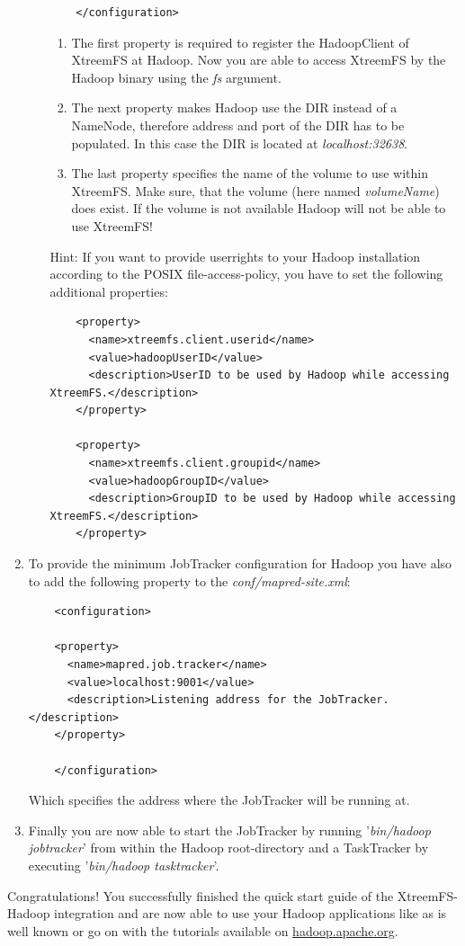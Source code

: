 \documentclass[a4paper,10pt]{book}
\begin{document}
\begin{enumerate}
\begin{enumerate}
\begin{verbatim}
	</configuration>
	\end{verbatim}
	\begin{enumerate}
	\item The first property is required to register the HadoopClient of XtreemFS at Hadoop. Now you are able to access 	
	XtreemFS by the Hadoop binary using the \textit{fs} argument. 
	\item The next property makes Hadoop use the DIR instead of a 
	NameNode, therefore address and port of the DIR has to be populated. In this case the DIR is located at 
	\textit{localhost:32638}. 
	\item The last property specifies the name of the volume to use within XtreemFS. Make sure, that the volume (here 
	named \textit{volumeName}) does exist. If the volume is not available Hadoop will not be able to use XtreemFS!
	\end{enumerate}
	Hint: If you want to provide userrights to your Hadoop installation according to the POSIX file-access-policy, you 
	have to set the following additional properties: 
	\begin{verbatim}
	<property>
	  <name>xtreemfs.client.userid</name>
	  <value>hadoopUserID</value>
	  <description>UserID to be used by Hadoop while accessing XtreemFS.</description>
	</property>

	<property>
	  <name>xtreemfs.client.groupid</name>
	  <value>hadoopGroupID</value>
	  <description>GroupID to be used by Hadoop while accessing XtreemFS.</description>
	</property>
	\end{verbatim}
	\end{enumerate}

\item To provide the minimum JobTracker configuration for Hadoop you have also to add the following property to the 
	\textit{conf/mapred-site.xml}:
	
	\begin{verbatim}
	<configuration>

	<property>
	  <name>mapred.job.tracker</name>
	  <value>localhost:9001</value>
	  <description>Listening address for the JobTracker.</description>
	</property>

	</configuration>
	\end{verbatim}
	Which specifies the address where the JobTracker will be running at.

\item Finally you are now able to start the JobTracker by running '\textit{bin/hadoop jobtracker}' from within the Hadoop root-directory and a TaskTracker by executing '\textit{bin/hadoop tasktracker}'.

\end{enumerate}
Congratulations! You successfully finished the quick start guide of the XtreemFS-Hadoop integration and are now able to use your Hadoop applications like as is well known or go on with the tutorials available on \href{http://hadoop.apache.org}{hadoop.apache.org}.
\end{document}
